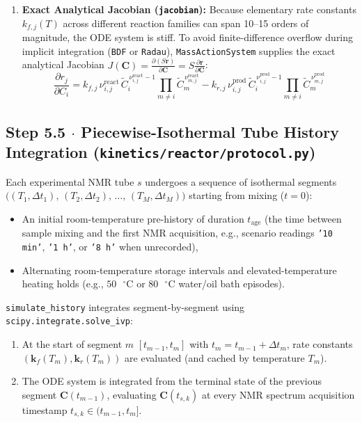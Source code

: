 \documentclass[11pt,a4paper]{article}
\begin{document}
\begin{enumerate}[leftmargin=1.8em]
    \item \textbf{Exact Analytical Jacobian (\texttt{jacobian}):}
    Because elementary rate constants $k_{f,j}(T)$ across different reaction families can span 10--15 orders of magnitude, the ODE system is stiff. To avoid finite-difference overflow during implicit integration (\texttt{BDF} or \texttt{Radau}), \texttt{MassActionSystem} supplies the exact analytical Jacobian $J(\mathbf{C}) = \frac{\partial (S\mathbf{r})}{\partial \mathbf{C}} = S \frac{\partial \mathbf{r}}{\partial \mathbf{C}}$:
    \begin{equation}
    \frac{\partial r_j}{\partial C_i} = k_{f,j} \, \nu_{i,j}^{\text{react}} \, \tilde{C}_i^{\,\nu_{i,j}^{\text{react}} - 1} \prod_{m \ne i} \tilde{C}_m^{\,\nu_{m,j}^{\text{react}}} - k_{r,j} \, \nu_{i,j}^{\text{prod}} \, \tilde{C}_i^{\,\nu_{i,j}^{\text{prod}} - 1} \prod_{m \ne i} \tilde{C}_m^{\,\nu_{m,j}^{\text{prod}}}
    \end{equation}
\end{enumerate}

\subsection*{Step 5.5 $\cdot$ Piecewise-Isothermal Tube History Integration (\texttt{kinetics/\allowbreak{}reactor/\allowbreak{}protocol.py})}

Each experimental NMR tube $s$ undergoes a sequence of isothermal segments $\big((T_1, \Delta t_1),\, (T_2, \Delta t_2),\, \dots,\, (T_M, \Delta t_M)\big)$ starting from mixing ($t = 0$):
\begin{itemize}[leftmargin=1.8em]
    \item An initial room-temperature pre-history of duration $t_{\text{age}}$ (the time between sample mixing and the first NMR acquisition, e.g., scenario readings \texttt{'10 min'}, \texttt{'1 h'}, or \texttt{'8 h'} when unrecorded),
    \item Alternating room-temperature storage intervals and elevated-temperature heating holds (e.g., $50\text{ }^\circ\text{C}$ or $80\text{ }^\circ\text{C}$ water/oil bath episodes).
\end{itemize}

\texttt{simulate\_\allowbreak{}history} integrates segment-by-segment using \texttt{scipy.integrate.solve\_\allowbreak{}ivp}:
\begin{enumerate}[leftmargin=1.8em]
    \item At the start of segment $m$ $[t_{m-1}, t_m]$ with $t_m = t_{m-1} + \Delta t_m$, rate constants $(\mathbf{k}_f(T_m), \mathbf{k}_r(T_m))$ are evaluated (and cached by temperature $T_m$).
    \item The ODE system is integrated from the terminal state of the previous segment $\mathbf{C}(t_{m-1})$, evaluating $\mathbf{C}(t_{s,k})$ at every NMR spectrum acquisition timestamp $t_{s,k} \in (t_{m-1}, t_m]$.
\end{enumerate}
\end{document}

